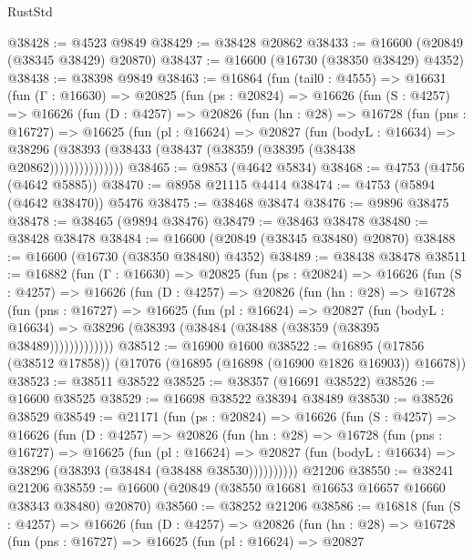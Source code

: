 \begin{lexlean}{RustStd}
\begin{coremodule}
@38428 := @4523 @9849
@38429 := @38428 @20862
@38433 := @16600 (@20849 (@38345 @38429) @20870)
@38437 := @16600 (@16730 (@38350 @38429) @4352)
@38438 := @38398 @9849
@38463 := @16864
    (fun (tail0 : @4555) =>
    @16631
      (fun (Γ : @16630) =>
      @20825
        (fun (ps : @20824) =>
        @16626
          (fun (S : @4257) =>
          @16626
            (fun (D : @4257) =>
            @20826
              (fun (hn : @28) =>
              @16728
                (fun (pns : @16727) =>
                @16625
                  (fun (pl : @16624) =>
                  @20827
                    (fun (bodyL : @16634) =>
                    @38296 (@38393 (@38433 (@38437 (@38359 (@38395 (@38438 @20862)))))))))))))))
@38465 := @9853 (@4642 @5834)
@38468 := @4753 (@4756 (@4642 @5885))
@38470 := @8958 @21115 @4414
@38474 := @4753 (@5894 (@4642 @38470)) @5476
@38475 := @38468 @38474
@38476 := @9896 @38475
@38478 := @38465 (@9894 @38476)
@38479 := @38463 @38478
@38480 := @38428 @38478
@38484 := @16600 (@20849 (@38345 @38480) @20870)
@38488 := @16600 (@16730 (@38350 @38480) @4352)
@38489 := @38438 @38478
@38511 := @16882
    (fun (Γ : @16630) =>
    @20825
      (fun (ps : @20824) =>
      @16626
        (fun (S : @4257) =>
        @16626
          (fun (D : @4257) =>
          @20826
            (fun (hn : @28) =>
            @16728
              (fun (pns : @16727) =>
              @16625
                (fun (pl : @16624) =>
                @20827
                  (fun (bodyL : @16634) =>
                  @38296 (@38393 (@38484 (@38488 (@38359 (@38395 @38489)))))))))))))
@38512 := @16900 @1600
@38522 := @16895 (@17856 (@38512 @17858)) (@17076 (@16895 (@16898 (@16900 @1826 @16903)) @16678))
@38523 := @38511 @38522
@38525 := @38357 (@16691 @38522)
@38526 := @16600 @38525
@38529 := @16698 @38522 @38394 @38489
@38530 := @38526 @38529
@38549 := @21171
    (fun (ps : @20824) =>
    @16626
      (fun (S : @4257) =>
      @16626
        (fun (D : @4257) =>
        @20826
          (fun (hn : @28) =>
          @16728
            (fun (pns : @16727) =>
            @16625
              (fun (pl : @16624) =>
              @20827 (fun (bodyL : @16634) => @38296 (@38393 (@38484 (@38488 @38530))))))))))
    @21206
@38550 := @38241 @21206
@38559 := @16600 (@20849 (@38550 @16681 @16653 @16657 @16660 @38343 @38480) @20870)
@38560 := @38252 @21206
@38586 := @16818
    (fun (S : @4257) =>
    @16626
      (fun (D : @4257) =>
      @20826
        (fun (hn : @28) =>
        @16728
          (fun (pns : @16727) =>
          @16625
            (fun (pl : @16624) =>
            @20827

\end{coremodule}
\end{lexlean}
